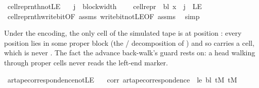 \begin{isabellebody}
\endisatagproof
{\isafoldproof}%
%
\isadelimproof
\isanewline
%
\endisadelimproof
\isanewline
{}\isamarkupfalse%
\ cell{\isacharunderscore}{\kern0pt}repr{\isacharunderscore}{\kern0pt}nth{\isacharunderscore}{\kern0pt}not{\isacharunderscore}{\kern0pt}LE{}{\isacharcolon}{\kern0pt}\isanewline
\ \ \ {\isachardoublequoteopen}j\ {\isacharless}{\kern0pt}\ block{\isacharunderscore}{\kern0pt}width\ {\isasymGamma}{\isachardoublequoteclose}\isanewline
\ \ \ {\isachardoublequoteopen}cell{\isacharunderscore}{\kern0pt}repr\ {\isasymGamma}\ bl\ x\ {\isacharbang}{\kern0pt}\ j\ {\isasymnoteq}\ LE{}{\isachardoublequoteclose}\isanewline
%
\isadelimproof
\ \ %
\endisadelimproof
%
\isatagproof
{}\isamarkupfalse%
\ cell{\isacharunderscore}{\kern0pt}repr{\isacharunderscore}{\kern0pt}nth{\isacharunderscore}{\kern0pt}write{\isacharunderscore}{\kern0pt}bit{\isacharbrackleft}{\kern0pt}OF\ assms{\isacharbrackright}{\kern0pt}\ write{\isacharunderscore}{\kern0pt}bit{\isacharunderscore}{\kern0pt}not{\isacharunderscore}{\kern0pt}LE{}{\isacharbrackleft}{\kern0pt}OF\ assms{\isacharbrackright}{\kern0pt}\ \isamarkupfalse%
\ simp%
\endisatagproof
{\isafoldproof}%
%
\isadelimproof
%
\endisadelimproof
%
\begin{isamarkuptext}%
Under the encoding, the only  cell of the simulated
  tape is at position : every position  lies in
  some proper block  (the
  / decomposition of ) and so
  carries a  cell, which is never .  The
  fact the advance back-walk's  guard rests on: a head
  walking through proper cells never reads the left-end marker.%
\end{isamarkuptext}\isamarkuptrue%
\isamarkupfalse%
\ ar{\isacharunderscore}{\kern0pt}tape{\isacharunderscore}{\kern0pt}correspondence{\isacharunderscore}{\kern0pt}not{\isacharunderscore}{\kern0pt}LE{}{\isacharcolon}{\kern0pt}\isanewline
\ \ \ corr{\isacharcolon}{\kern0pt}\ {\isachardoublequoteopen}ar{\isacharunderscore}{\kern0pt}tape{\isacharunderscore}{\kern0pt}correspondence\ {\isasymGamma}\ le\ bl\ tM\ tM{\isacharprime}{\kern0pt}{\isachardoublequoteclose}\isanewline

\end{isabellebody}
